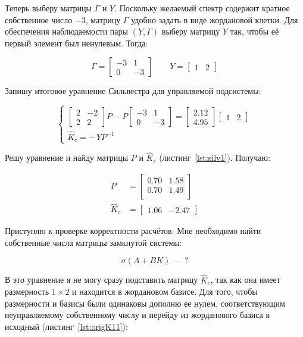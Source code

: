 \documentclass[a4paper,12pt]{article}
\begin{document}
Теперь выберу матрицы $\Gamma$ и $Y$. Поскольку желаемый спектр содержит кратное собственное число $-3$, матрицу $\Gamma$ удобно задать в виде жордановой клетки. Для обеспечения наблюдаемости пары $(Y,\Gamma)$ выберу матрицу $Y$ так, чтобы её первый элемент был ненулевым. Тогда:

\[
\Gamma =
\begin{bmatrix}
	-3 & 1 \\
	0 & -3
\end{bmatrix}
\qquad
Y =
\begin{bmatrix}
	1 & 2
\end{bmatrix}
\]

Запишу итоговое уравнение Сильвестра для управляемой подсистемы:

\[
\begin{cases}
	\begin{bmatrix}
		2 & -2 \\
		2 & 2
	\end{bmatrix}
	P
	-
	P
	\begin{bmatrix}
		-3 & 1 \\
		0 & -3
	\end{bmatrix}
	=
	\begin{bmatrix}
		2.12 \\
		4.95
	\end{bmatrix}
	\begin{bmatrix}
		1 & 2
	\end{bmatrix} \\[12pt]
	\hat K_c = -\,Y P^{-1}
\end{cases}
\]


Решу уравнение и найду матрицы \(P\) и \(\hat K_c\) (листинг~\ref{lst:silv1}). Получаю: 

\[
\begin{aligned}
	P &= \begin{bmatrix}
		0.70 & 1.58 \\
		0.70 & 1.49 \\
	\end{bmatrix} 
	\\[10pt]
	\hat K_c &= \begin{bmatrix}
		1.06 & -2.47
	\end{bmatrix}
\end{aligned}
\]


Приступлю к проверке корректности расчётов. Мне необходимо найти собственные числа матрицы замкнутой системы:

\[
\sigma(A + B K) \text{ --- ?}
\]

В это уравнение я не могу сразу подставить матрицу \(\hat K_c\), так как она имеет размерность \(1 \times 2\) и находится в жордановом базисе. Для того, чтобы размерности и базисы были одинаковы дополню ее нулем, соответствующим неуправляемому собственному числу и перейду из жорданового базиса в исходный (листинг~\ref{lst:origK11}):
\end{document}
